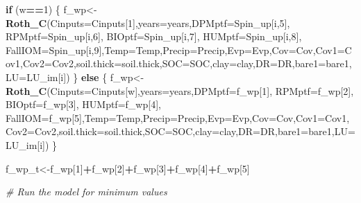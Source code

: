 \documentclass[
  10pt,
  b5paper,
]{book}
\newenvironment{Shaded}{\begin{snugshade}}{\end{snugshade}}
\newcommand{\CommentTok}[1]{\textcolor[rgb]{0.56,0.35,0.01}{\textit{#1}}}
\newcommand{\ControlFlowTok}[1]{\textcolor[rgb]{0.13,0.29,0.53}{\textbf{#1}}}
\newcommand{\DataTypeTok}[1]{\textcolor[rgb]{0.13,0.29,0.53}{#1}}
\newcommand{\DecValTok}[1]{\textcolor[rgb]{0.00,0.00,0.81}{#1}}
\newcommand{\KeywordTok}[1]{\textcolor[rgb]{0.13,0.29,0.53}{\textbf{#1}}}
\newcommand{\NormalTok}[1]{#1}
\newcommand{\OperatorTok}[1]{\textcolor[rgb]{0.81,0.36,0.00}{\textbf{#1}}}
\begin{document}
\begin{Shaded}
\begin{Highlighting}[]
{\ControlFlowTok{if}\NormalTok{ (w}\OperatorTok{==}\DecValTok{1}\NormalTok{) \{}
\NormalTok{f_wp<-}\KeywordTok{Roth_C}\NormalTok{(}\DataTypeTok{Cinputs=}\NormalTok{Cinputs[}\DecValTok{1}\NormalTok{],}\DataTypeTok{years=}\NormalTok{years,}\DataTypeTok{DPMptf=}\NormalTok{Spin_up[i,}\DecValTok{5}\NormalTok{], }\DataTypeTok{RPMptf=}\NormalTok{Spin_up[i,}\DecValTok{6}\NormalTok{], }\DataTypeTok{BIOptf=}\NormalTok{Spin_up[i,}\DecValTok{7}\NormalTok{], }\DataTypeTok{HUMptf=}\NormalTok{Spin_up[i,}\DecValTok{8}\NormalTok{], }\DataTypeTok{FallIOM=}\NormalTok{Spin_up[i,}\DecValTok{9}\NormalTok{],}\DataTypeTok{Temp=}\NormalTok{Temp,}\DataTypeTok{Precip=}\NormalTok{Precip,}\DataTypeTok{Evp=}\NormalTok{Evp,}\DataTypeTok{Cov=}\NormalTok{Cov,}\DataTypeTok{Cov1=}\NormalTok{Cov1,}\DataTypeTok{Cov2=}\NormalTok{Cov2,}\DataTypeTok{soil.thick=}\NormalTok{soil.thick,}\DataTypeTok{SOC=}\NormalTok{SOC,}\DataTypeTok{clay=}\NormalTok{clay,}\DataTypeTok{DR=}\NormalTok{DR,}\DataTypeTok{bare1=}\NormalTok{bare1,}\DataTypeTok{LU=}\NormalTok{LU_im[i])}
\NormalTok{\} }\ControlFlowTok{else}\NormalTok{ \{}
\NormalTok{f_wp<-}\KeywordTok{Roth_C}\NormalTok{(}\DataTypeTok{Cinputs=}\NormalTok{Cinputs[w],}\DataTypeTok{years=}\NormalTok{years,}\DataTypeTok{DPMptf=}\NormalTok{f_wp[}\DecValTok{1}\NormalTok{], }\DataTypeTok{RPMptf=}\NormalTok{f_wp[}\DecValTok{2}\NormalTok{], }\DataTypeTok{BIOptf=}\NormalTok{f_wp[}\DecValTok{3}\NormalTok{], }\DataTypeTok{HUMptf=}\NormalTok{f_wp[}\DecValTok{4}\NormalTok{], }\DataTypeTok{FallIOM=}\NormalTok{f_wp[}\DecValTok{5}\NormalTok{],}\DataTypeTok{Temp=}\NormalTok{Temp,}\DataTypeTok{Precip=}\NormalTok{Precip,}\DataTypeTok{Evp=}\NormalTok{Evp,}\DataTypeTok{Cov=}\NormalTok{Cov,}\DataTypeTok{Cov1=}\NormalTok{Cov1,}\DataTypeTok{Cov2=}\NormalTok{Cov2,}\DataTypeTok{soil.thick=}\NormalTok{soil.thick,}\DataTypeTok{SOC=}\NormalTok{SOC,}\DataTypeTok{clay=}\NormalTok{clay,}\DataTypeTok{DR=}\NormalTok{DR,}\DataTypeTok{bare1=}\NormalTok{bare1,}\DataTypeTok{LU=}\NormalTok{LU_im[i])}
\NormalTok{\}}

\NormalTok{f_wp_t<-f_wp[}\DecValTok{1}\NormalTok{]}\OperatorTok{+}\NormalTok{f_wp[}\DecValTok{2}\NormalTok{]}\OperatorTok{+}\NormalTok{f_wp[}\DecValTok{3}\NormalTok{]}\OperatorTok{+}\NormalTok{f_wp[}\DecValTok{4}\NormalTok{]}\OperatorTok{+}\NormalTok{f_wp[}\DecValTok{5}\NormalTok{]}

\CommentTok{# Run the model for minimum values}

}
\end{Highlighting}
\end{Shaded}
\end{document}
